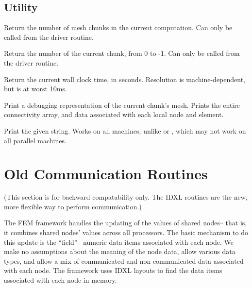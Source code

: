 \documentclass[10pt]{article}
\begin{document}
\subsection{Utility}


     Return the number of mesh chunks in the current computation.  Can
     only be called from the driver routine.


     Return the number of the current chunk, from 0 to
     -1.  Can only be called from the driver routine.


     Return the current wall clock time, in seconds.  Resolution is
     machine-dependent, but is at worst 10ms.


     Print a debugging representation of the current chunk's mesh.
     Prints the entire connectivity array, and data associated with
     each local node and element.


     Print the given string.  Works on all machines; unlike  or
     , which may not work on all parallel machines.






\section{Old Communication Routines}

(This section is for backward compatability only.  The IDXL routines
are the new, more flexible way to perform communication.)

The FEM framework handles the updating of the values of shared nodes-- that
is, it combines shared nodes' values across all processors.  The basic
mechanism to do this update is the ``field''-- numeric data items associated
with each node. We make no assumptions about the meaning of the node data,
allow various data types, and allow a mix of communicated and non-communicated 
data associated with each node.  The framework uses IDXL layouts to find the data items
associated with each node in memory.
\end{document}
